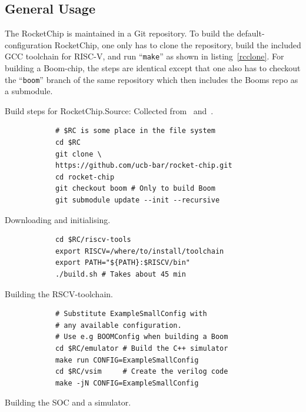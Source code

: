\documentclass[journal,a4paper]{IEEEtran}
\begin{document}
\subsection{General Usage}
The RocketChip is maintained in a Git repository.
To build the default-configuration RocketChip, one only has to clone the repository, build the included GCC toolchain for RISC-V, and run ``\texttt{make}'' as shown in listing~\ref{rcclone}. For building a Boom-chip, the steps are identical except that one also has to checkout the ``\texttt{boom}'' branch of the same repository which then includes the Booms repo as a submodule.


\begin{table}
	\caption{Build steps for RocketChip.\newline\hspace{\linewidth}Source: Collected from~\cite{rc-github} and~\cite{boom-github}.}
	\begin{subtable}[b]{0.9\linewidth}
		\begin{verbatim}
			# $RC is some place in the file system
			cd $RC
			git clone \
			https://github.com/ucb-bar/rocket-chip.git
			cd rocket-chip
			git checkout boom # Only to build Boom
			git submodule update --init --recursive
		\end{verbatim}
		\caption{Downloading and initialising.}
		\label{rcclone}
	\end{subtable}
	\begin{subtable}[b]{0.9\linewidth}
		\begin{verbatim}
			cd $RC/riscv-tools
			export RISCV=/where/to/install/toolchain
			export PATH="${PATH}:$RISCV/bin"
			./build.sh # Takes about 45 min
		\end{verbatim}
		\caption{Building the RSCV-toolchain.}
		\label{rctoolchain}
	\end{subtable}
	\begin{subtable}[b]{0.9\linewidth}
		\begin{verbatim}
			# Substitute ExampleSmallConfig with
			# any available configuration.
			# Use e.g BOOMConfig when building a Boom
			cd $RC/emulator # Build the C++ simulator
			make run CONFIG=ExampleSmallConfig
			cd $RC/vsim     # Create the verilog code
			make -jN CONFIG=ExampleSmallConfig
		\end{verbatim}
		\caption{Building the SOC and a simulator.}
		\label{rcmake}
	\end{subtable}
\end{table}
\end{document}
